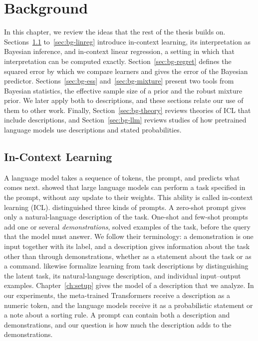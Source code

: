 \chapter{Background}\label{ch:background}

In this chapter, we review the ideas that the rest of the thesis builds on. Sections~\ref{sec:bg-icl} to~\ref{sec:bg-linreg} introduce in-context learning, its interpretation as Bayesian inference, and in-context linear regression, a setting in which that interpretation can be computed exactly. Section~\ref{sec:bg-regret} defines the squared error by which we compare learners and gives the error of the Bayesian predictor. Sections~\ref{sec:bg-ess} and~\ref{sec:bg-mixture} present two tools from Bayesian statistics, the effective sample size of a prior and the robust mixture prior. We later apply both to descriptions, and these sections relate our use of them to other work. Finally, Section~\ref{sec:bg-theory} reviews theories of ICL that include descriptions, and Section~\ref{sec:bg-llm} reviews studies of how pretrained language models use descriptions and stated probabilities.

\section{In-Context Learning}\label{sec:bg-icl}
A language model takes a sequence of tokens, the prompt, and predicts what comes next. \citet{brown2020} showed that large language models can perform a task specified in the prompt, without any update to their weights. This ability is called in-context learning (ICL). \citet{brown2020} distinguished three kinds of prompts. A zero-shot prompt gives only a natural-language description of the task. One-shot and few-shot prompts add one or several \emph{demonstrations}, solved examples of the task, before the query that the model must answer. We follow their terminology: a demonstration is one input together with its label, and a description gives information about the task other than through demonstrations, whether as a statement about the task or as a command. \citet{weller2020} likewise formalize learning from task descriptions by distinguishing the latent task, its natural-language description, and individual input--output examples. Chapter~\ref{ch:setup} gives the model of a description that we analyze. In our experiments, the meta-trained Transformers receive a description as a numeric token, and the language models receive it as a probabilistic statement or a note about a sorting rule. A prompt can contain both a description and demonstrations, and our question is how much the description adds to the demonstrations.

